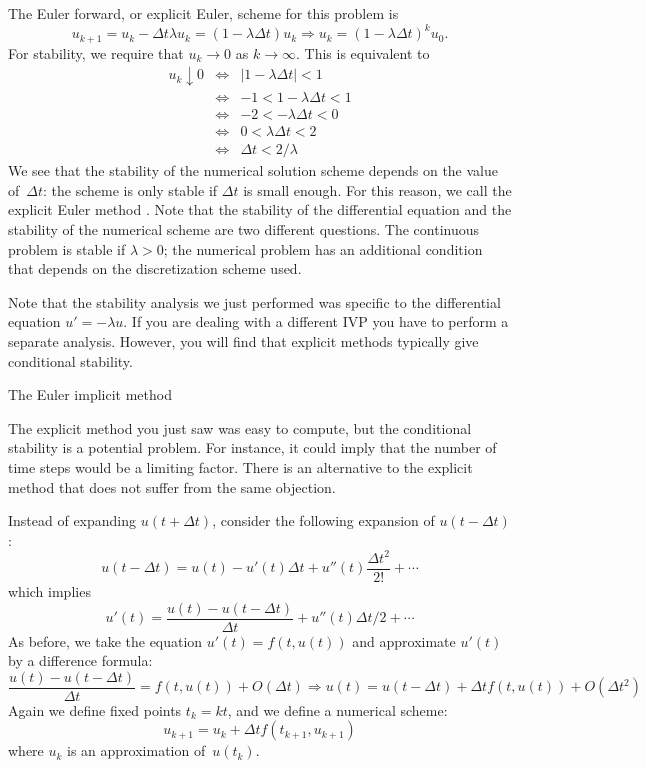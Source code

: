 The Euler forward, or explicit Euler, scheme for this problem is
\[ u_{k+1}=u_k-\Delta t \lambda u_k=(1-\lambda \Delta t)u_k
  \Rightarrow
  u_k=(1-\lambda\Delta t)^ku_0.
\]
For stability, we require that
$u_k\rightarrow 0$ as $k\rightarrow\infty$. This is equivalent to
  \begin{eqnarray*}
    u_k\downarrow 0
    &\Leftrightarrow&|1-\lambda \Delta t|<1\\
    &\Leftrightarrow&-1<1-\lambda\Delta t<1\\
    &\Leftrightarrow&-2<-\lambda\Delta t<0\\
    &\Leftrightarrow&0<\lambda\Delta t<2\\
    &\Leftrightarrow&\Delta t<2/\lambda
  \end{eqnarray*}
We see that the stability of the numerical solution scheme depends on
the value of~$\Delta t$: the scheme is only stable if $\Delta t$ is
small enough.  For this reason, we call the explicit Euler method
. Note that the stability of the
differential equation and the stability of the numerical scheme are
two different questions. The continuous problem is stable if
$\lambda>0$; the numerical problem has an additional condition that
depends on the discretization scheme used.

Note that the stability analysis we just performed was specific to the
differential equation $u'=-\lambda u$. If you are dealing with a
different \ac{IVP} you have to perform a separate analysis. However,
you will find that explicit methods typically give conditional stability.


 {The Euler implicit method}
\label{sec:implicit-euler}

The explicit method you just saw was easy to compute, but the
conditional stability is a potential problem. For instance, it could
imply that the number of time steps would be a limiting factor.
There is an alternative to the explicit method that does not suffer
from the same objection.

Instead of expanding $u(t+\Delta t)$, consider the following expansion
of $u(t-\Delta t)$:
\[ u(t-\Delta t)=u(t)-u'(t)\Delta t+u''(t)\frac{\Delta t^2}{2!}+\cdots \]
which implies
\[ u'(t)=\frac{u(t)-u(t-\Delta t)}{\Delta t}+u''(t)\Delta t/2+\cdots
\]
As before, we take the equation $u'(t)=f(t,u(t))$ and
approximate $u'(t)$ by a difference formula:
\[ \frac{u(t)-u(t-\Delta t)}{\Delta t}=f(t,u(t)) +O(\Delta t)
   \Rightarrow u(t)=u(t-\Delta t)+\Delta t f(t,u(t))+O(\Delta t^2)
\]
Again we define fixed points $t_k=kt$,
and we define a numerical scheme:
\[ u_{k+1}=u_k+\Delta tf(t_{k+1},u_{k+1}) \]
where $u_k$ is an approximation of~$u(t_k)$.

